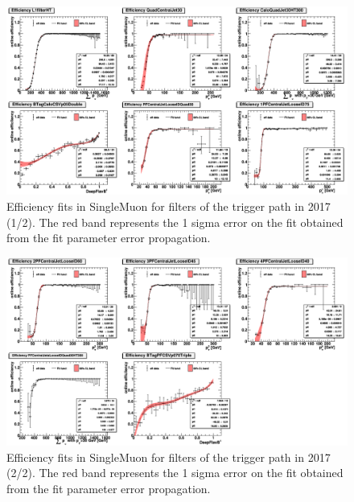 \begin{figure}[htbp!]
\begin{center}
    \includegraphics[width=0.9\linewidth]{Figures/AnalysisStrategy/triggerfits/TriggerEfficiencies_2017_TTBarCut_SingleMuon_2017_1_Fit.png}
\end{center}
\caption[Efficiency fits in SingleMuon for filters of the trigger path in 2017 (1/2)]{Efficiency fits in SingleMuon for filters of the trigger path in 2017 (1/2). The red band represents the 1 sigma error on the fit obtained from the fit parameter error propagation.}
\label{trigger:fig:SingleMuonFilterEfficiency2017_1}
\end{figure}

\begin{figure}[htbp!]
\begin{center}
    \includegraphics[width=0.9\linewidth]{Figures/AnalysisStrategy/triggerfits/TriggerEfficiencies_2017_TTBarCut_SingleMuon_2017_2_Fit.png}
\end{center}
\caption[Efficiency fits in SingleMuon for filters of the trigger path in 2017 (2/2)]{Efficiency fits in SingleMuon for filters of the trigger path in 2017 (2/2). The red band represents the 1 sigma error on the fit obtained from the fit parameter error propagation.}
\label{trigger:fig:SingleMuonFilterEfficiency2017_2}
\end{figure}
    
